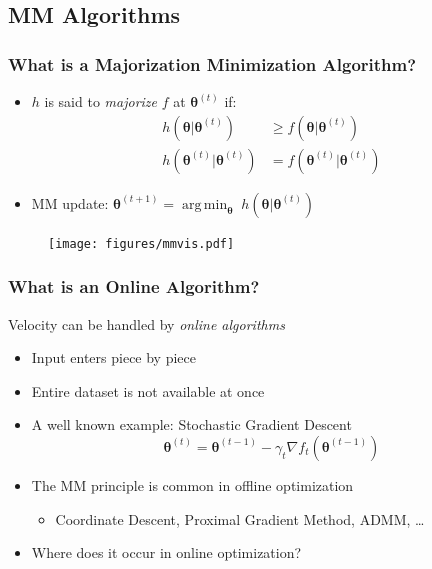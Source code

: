 \documentclass{beamer}
\newcommand{\iter}[2]{#1^{(#2)}}
\DeclareMathOperator*{\argmin}{arg\,min}
\begin{document}
\subsection{MM Algorithms}
\begin{frame}
  \frametitle{What is a Majorization Minimization Algorithm?}
  \begin{itemize}
    \item $h$ is said to \emph{majorize}  $f$ at $\iter{\bm\theta}{t}$ if:
    $$\begin{aligned}
      h(\bm\theta|\iter{\bm\theta}{t}) &\ge f(\bm\theta|\iter{\bm\theta}{t}) \\
      h(\iter{\bm\theta}{t}|\iter{\bm\theta}{t}) &= f(\iter{\bm\theta}{t}|\iter{\bm\theta}{t})
    \end{aligned}$$
    \item MM update: $\bm\theta^{(t+1)} = \argmin_{\bm\theta} \; h(\bm\theta|\bm\theta^{(t)})$
  \end{itemize}
\end{frame}
\begin{frame}
  \begin{figure}
    \texttt{[image: figures/mmvis.pdf]}
  \end{figure}
\end{frame}
\begin{frame}
  \frametitle{What is an Online Algorithm?}
  Velocity can be handled by \emph{online algorithms}
  \begin{itemize}
    \item Input enters piece by piece
    \item Entire dataset is not available at once
    \item A well known example: Stochastic Gradient Descent
    $$\iter{\bm\theta}{t} = \iter{\bm\theta}{t-1} - \gamma_t \nabla f_t(\iter{\bm\theta}{t-1})$$
  \end{itemize}
\end{frame}
\begin{frame}
  \begin{itemize}
    \item The MM principle is common in offline optimization
    \begin{itemize}
      \item Coordinate Descent, Proximal Gradient Method, ADMM, \ldots
    \end{itemize}
    \item Where does it occur in online optimization?
  \end{itemize}
\end{frame}
\end{document}
